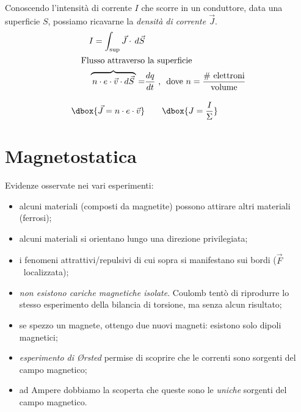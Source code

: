 \documentclass[a4paper,12pt,titlepage,openany]{book}
\theoremstyle{mydef}
\newcommand\dboxed[1]{\dbox{\ensuremath{#1}}}  %
\begin{document}
            \noindent
            Conoscendo l'intensità di corrente $I$ che scorre in un conduttore, data una superficie $S$, possiamo ricavarne
            la \emph{densità di corrente $\vec{J}$}.
            \begin{align}
                I = \int_{\sup}\vec{J}\cdot\,d\vec{S}& \notag\\
                \text{Flusso attraverso} & \text{ la superficie} \notag\\
                \overbrace{\,n\cdot e\cdot\vec{v}\cdot d\vec{S}\,} = &\frac{dq}{dt} \text{\ ,\ \ dove }
                n =\frac{\text{\# elettroni}}{\text{volume}} \notag\\[1em]
                \dboxed{\vec{J} = n\cdot e\cdot\vec{v}} & \qquad \dboxed{J = \frac{I}{\Sigma}}
            \end{align}

    \chapter{Magnetostatica}
        Evidenze osservate nei vari esperimenti:
        \begin{itemize}
            \item alcuni materiali (composti da magnetite) possono attirare altri materiali (ferrosi);
            \item alcuni materiali si orientano lungo una direzione privilegiata;
            \item i fenomeni attrattivi/repulsivi di cui sopra si manifestano sui bordi ($\vec{F}$~localizzata);
            \item \emph{non esistono cariche magnetiche isolate}. Coulomb tentò di riprodurre lo stesso esperimento
                della bilancia di torsione, ma senza alcun risultato;
            \item se spezzo un magnete, ottengo due nuovi magneti: esistono solo dipoli magnetici;
            \item \emph{esperimento di \O{}rsted} permise di scoprire che le correnti sono sorgenti del campo magnetico;
            \item ad Ampere dobbiamo la scoperta che queste sono le \emph{uniche} sorgenti del campo magnetico.
        \end{itemize}
    
    \appendix
\end{document}
